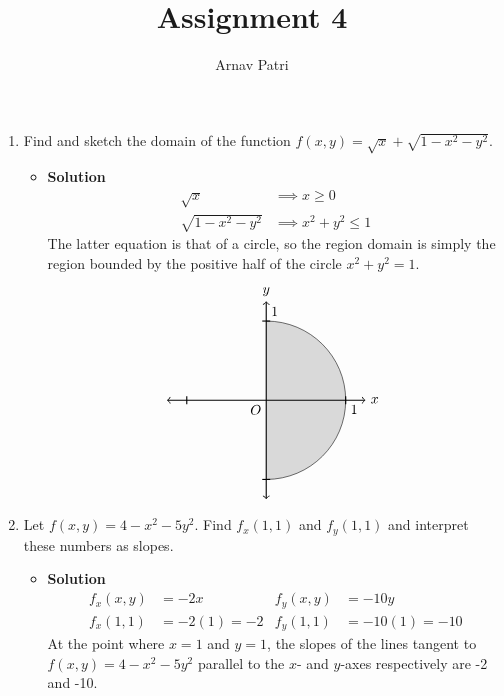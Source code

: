 \documentclass[12pt, A4]{article}
\title{Assignment 4}
\author{Arnav Patri}
\begin{document}
	\maketitle
		\begin{enumerate}[1)]
			\item
				Find and sketch the domain of the function $f(x, y) = \sqrt{x} + \sqrt{1 - x^2 - y^2}$.
				\begin{itemize}
					\item[] \textbf{Solution}
						\begin{align*}
							\sqrt{x} &\implies x \ge 0 \\
							\sqrt{1 - x^2 - y^2} &\implies x^2 + y^2 \le 1
						\end{align*}
						The latter equation is that of a circle, so the region domain is simply the region bounded by the positive half of the circle $x^2 + y^2 = 1$.
						\[\begin{tikzpicture}[scale =2]
							\draw[fill = gray!30] (0, -1) arc[start angle = -90, end angle = 90, radius = 1cm];
							\draw[thick, <->] (-1.25, 0) -- (1.25, 0) node[anchor = west]{$x$};
							\draw[thick, <->] (0, -1.25) -- (0, 1.25) node[anchor = south]{$y$};
							\node at (0, 0) [anchor = north east] {$O$};
							\foreach \x in {-1, 1}
								\draw[thick] (\x, -0.05) -- (\x, 0.05);
							\foreach \y in {-1, 1}
								\draw[thick] (-0.05, \y) -- (0.05, \y);
							\node at (1, 0) [anchor = north west]{1};
							\node at (0, 1) [anchor = south west]{1};
						\end{tikzpicture}\]
				\end{itemize}
			\item
				Let $f(x, y) = 4 - x^2 - 5y^2$. Find $f_x(1, 1)$ and $f_y(1, 1)$ and interpret these numbers as slopes.
				\begin{itemize}
					\item[] \textbf{Solution}
						\begin{align*}
							f_x(x, y) &= -2x &
									f_y(x, y) &= -10y \\
							f_x(1, 1) &= -2(1) = -2 &
									f_y(1, 1) &= -10(1) = -10
						\end{align*}
						At the point where $x = 1$ and $y = 1$, the slopes of the lines tangent to $f(x, y) = 4 - x^2 - 5y^2$ parallel to the $x$- and $y$-axes respectively are -2 and -10.
				\end{itemize}


\end{enumerate}
\end{document}
